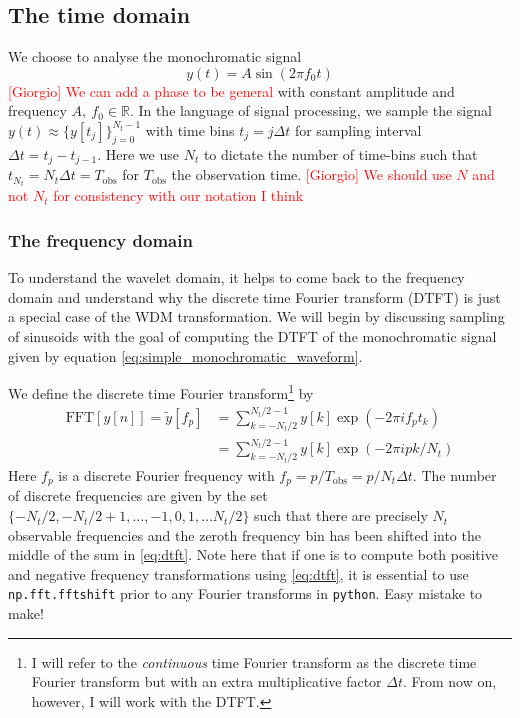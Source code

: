 \documentclass{article}
\begin{document}
\subsection{The time domain}
We choose to analyse the monochromatic signal
\begin{equation}\label{eq:simple_monochromatic_waveform}
y(t) = A\sin(2\pi f_{0} t)
\end{equation}
\textcolor{red}{[Giorgio] We can add a phase to be general} 
with constant amplitude and frequency $A, \ f_{0} \in \mathbb{R}$. In the language of signal processing, we sample the signal $y(t) \approx \{y[t_{j}]\}_{j=0}^{N_{t} - 1}$ with time bins $t_{j} = j\Delta t$ for sampling interval $\Delta t = t_{j} - t_{j-1}$. Here we use $N_{t}$ to dictate the number of time-bins such that $t_{N_{t}} = N_{t}\Delta t = T_{\text{obs}}$ for $T_{\text{obs}}$ the observation time. 
\textcolor{red}{[Giorgio] We should use $N$ and not $N_t$ for consistency with our notation I think} 

\subsubsection{The frequency domain}
To understand the wavelet domain, it helps to come back to the frequency domain and understand why the discrete time Fourier transform (DTFT) is just a special case of the WDM transformation. We will begin by discussing sampling of sinusoids with the goal of computing the DTFT of the monochromatic signal given by equation \eqref{eq:simple_monochromatic_waveform}. 

We define the discrete time Fourier transform\footnote{I will refer to the \textit{continuous} time Fourier transform as the discrete time Fourier transform but with an extra multiplicative factor $\Delta t$. From now on, however, I will work with the DTFT.} by 
\begin{align}\label{eq:dtft}
    \text{FFT}[y[n]] = \tilde{y}[f_{p}] &= \sum_{k = -N_{t}/2}^{N_{t}/2 - 1} y[k]\exp(-2\pi i f_{p}t_{k}) \\
    &= \sum_{k = -N_{t}/2}^{N_{t}/2 - 1} y[k]\exp(-2\pi i p k / N_{t})
\end{align}
Here $f_{p}$ is a discrete Fourier frequency with $f_{p} = p/T_{\text{obs}} = p/N_{t}\Delta t$. The number of discrete frequencies are given by the set $\{-N_{t}/2, -N_{t}/2 + 1, \ldots, -1, 0, 1, \ldots N_{t}/2\}$ such that there are precisely $N_{t}$ observable frequencies and the zeroth frequency bin has been shifted into the middle of the sum in \eqref{eq:dtft}. Note here that if one is to compute both positive and negative frequency transformations using \eqref{eq:dtft}, it is essential to use \texttt{np.fft.fftshift} prior to any Fourier transforms in \texttt{python}. Easy mistake to make! 
\end{document}
